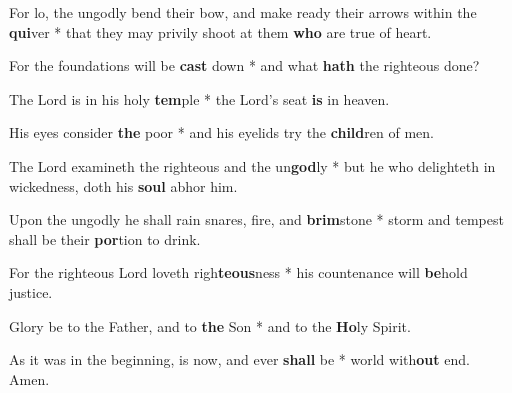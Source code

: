 \begin{multicols}{2}
	For lo, the ungodly bend their bow, and make ready their arrows within the \textbf{qui}ver * that they may privily shoot at them \textbf{who} are true of heart.
	
	For the foundations will be \textbf{cast} down * and what \textbf{hath} the righteous done?
	
	The Lord is in his holy \textbf{tem}ple * the Lord's seat \textbf{is} in heaven.
	
	His eyes consider \textbf{the} poor * and his eyelids try the \textbf{child}ren of men.
	
	The Lord examineth the righteous and the un\textbf{god}ly * but he who delighteth in wickedness, doth his \textbf{soul} abhor him.
	
	Upon the ungodly he shall rain snares, fire, and \textbf{brim}stone * storm and tempest shall be their \textbf{por}tion to drink.
	
	For the righteous Lord loveth righ\textbf{teous}ness * his countenance will \textbf{be}hold justice.
	
	Glory be to the Father, and to \textbf{the} Son * and to the \textbf{Ho}ly Spirit.
	
	As it was in the beginning, is now, and ever \textbf{shall} be * world with\textbf{out} end. Amen.
\end{multicols}
